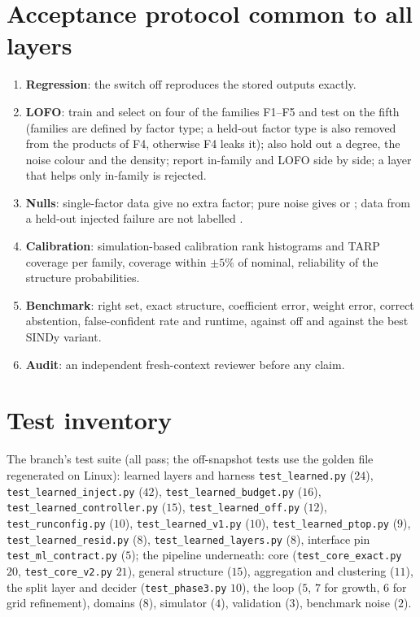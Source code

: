 \section{Acceptance protocol common to all layers}\label{app:acceptance}
\begin{enumerate}
\item \textbf{Regression}: the switch off reproduces the stored outputs exactly.
\item \textbf{LOFO}: train and select on four of the families F1--F5 and test on the fifth (families are defined by factor type; a held-out factor type is also removed from the products of F4, otherwise F4 leaks it); also hold out a degree, the noise colour and the density; report in-family and LOFO side by side; a layer that helps only in-family is rejected.
\item \textbf{Nulls}: single-factor data give no extra factor; pure noise gives \UND{} or \MIS; data from a held-out injected failure are not labelled \FC.
\item \textbf{Calibration}: simulation-based calibration rank histograms and TARP coverage per family, coverage within $\pm5\%$ of nominal, reliability of the structure probabilities.
\item \textbf{Benchmark}: right set, exact structure, coefficient error, weight error, correct abstention, false-confident rate and runtime, against off and against the best SINDy variant.
\item \textbf{Audit}: an independent fresh-context reviewer before any claim.
\end{enumerate}

\section{Test inventory}\label{app:tests}
The branch's test suite (all pass; the off-snapshot tests use the golden file regenerated on Linux): learned layers and harness \texttt{test\_learned.py} ($24$), \texttt{test\_learned\_inject.py} ($42$), \texttt{test\_learned\_budget.py} ($16$), \texttt{test\_learned\_controller.py} ($15$), \texttt{test\_learned\_off.py} ($12$), \texttt{test\_runconfig.py} ($10$), \texttt{test\_learned\_v1.py} ($10$), \texttt{test\_learned\_ptop.py} ($9$), \texttt{test\_learned\_resid.py} ($8$), \texttt{test\_learned\_layers.py} ($8$), interface pin \texttt{test\_ml\_contract.py} ($5$);
the pipeline underneath: core (\texttt{test\_core\_exact.py} $20$, \texttt{test\_core\_v2.py} $21$), general structure ($15$), aggregation and clustering ($11$), the split layer and decider (\texttt{test\_phase3.py} $10$), the loop ($5$, $7$ for growth, $6$ for grid refinement), domains ($8$), simulator ($4$), validation ($3$), benchmark noise ($2$).

